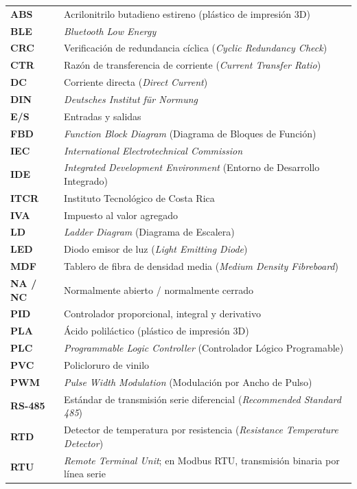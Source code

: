 \documentclass[12pt,a4paper,oneside]{report}
\begin{document}
\renewcommand{\arraystretch}{1.3}
\begin{longtable}{@{}>{\bfseries}p{2.2cm} p{\dimexpr\textwidth-2.2cm-2\tabcolsep\relax}@{}}
ABS   & Acrilonitrilo butadieno estireno (plástico de impresión 3D) \\
BLE   & \textit{Bluetooth Low Energy} \\
CRC   & Verificación de redundancia cíclica (\textit{Cyclic Redundancy Check}) \\
CTR   & Razón de transferencia de corriente (\textit{Current Transfer Ratio}) \\
DC  & Corriente directa (\textit{Direct Current}) \\
DIN   & \textit{Deutsches Institut für Normung} \\
E/S   & Entradas y salidas \\
FBD   & \textit{Function Block Diagram} (Diagrama de Bloques de Función) \\
IEC   & \textit{International Electrotechnical Commission} \\
IDE   & \textit{Integrated Development Environment} (Entorno de Desarrollo Integrado) \\
ITCR  & Instituto Tecnológico de Costa Rica \\
IVA   & Impuesto al valor agregado \\
LD    & \textit{Ladder Diagram} (Diagrama de Escalera) \\
LED   & Diodo emisor de luz (\textit{Light Emitting Diode}) \\
MDF   & Tablero de fibra de densidad media (\textit{Medium Density Fibreboard}) \\
NA / NC & Normalmente abierto / normalmente cerrado \\
PID   & Controlador proporcional, integral y derivativo \\
PLA   & Ácido poliláctico (plástico de impresión 3D) \\
PLC   & \textit{Programmable Logic Controller} (Controlador Lógico Programable) \\
PVC   & Policloruro de vinilo \\
PWM   & \textit{Pulse Width Modulation} (Modulación por Ancho de Pulso) \\
RS-485 & Estándar de transmisión serie diferencial (\textit{Recommended Standard 485}) \\
RTD   & Detector de temperatura por resistencia (\textit{Resistance Temperature Detector}) \\
RTU   & \textit{Remote Terminal Unit}; en Modbus RTU, transmisión binaria por línea serie \\

\end{longtable}
\end{document}
